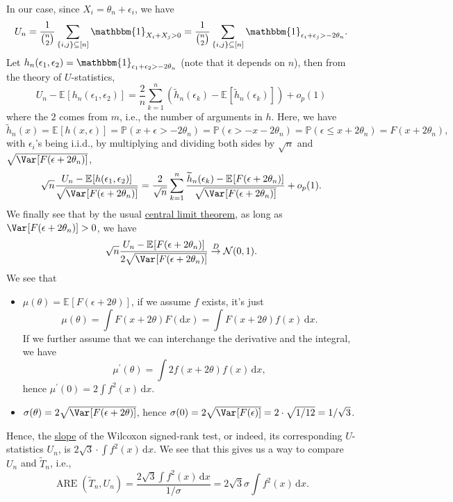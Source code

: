 In our case, since \(X_i = \theta _n + \epsilon _i\), we have
\[
	U_n
	= \frac{1}{\binom{n}{2}} \sum_{\{ i, j \} \subseteq [n]} \mathbbm{1}_{X_i + X_j > 0}
	= \frac{1}{\binom{n}{2}} \sum_{\{ i, j \} \subseteq [n]} \mathbbm{1}_{\epsilon _i + \epsilon _j > - 2 \theta _n}.
\]
Let \(h_n(\epsilon _1, \epsilon _2) = \mathbbm{1}_{\epsilon _1 + \epsilon _2 > - 2 \theta _n} \) (note that it depends on \(n\)), then from the theory of \(U\)-statistics,
\[
	U_n - \mathbb{E}_{}[h_n(\epsilon _1, \epsilon _2)]
	= \frac{2}{n} \sum_{k=1}^{n} \left( \widetilde{h} _n(\epsilon _k) - \mathbb{E}_{}[\widetilde{h} _n(\epsilon _k)] \right) + o_p(1)
\]
where the \(2\) comes from \(m\), i.e., the number of arguments in \(h\). Here, we have
\[
	\widetilde{h} _n(x)
	= \mathbb{E}_{}[h(x, \epsilon )]
	= \mathbb{P} (x + \epsilon > - 2\theta _n)
	= \mathbb{P} (\epsilon > -x - 2\theta _n)
	= \mathbb{P} (\epsilon \leq x + 2 \theta _n)
	= F(x + 2 \theta _n),
\]
with \(\epsilon _i\)'s being i.i.d., by multiplying and dividing both sides by \(\sqrt{n} \) and \(\sqrt{\Var_{}[F(\epsilon + 2 \theta _n)] } \),
\[
	\sqrt{n} \frac{U_n - \mathbb{E}_{}[h(\epsilon _1 , \epsilon _2)]}{\sqrt{\Var_{}[F(\epsilon + 2 \theta _n)] } }
	= \frac{2}{\sqrt{n} } \sum_{k=1}^{n} \frac{\widetilde{h} _n(\epsilon _k) - \mathbb{E}_{}[F(\epsilon + 2 \theta _n)] }{\sqrt{\Var_{}[F(\epsilon + 2 \theta _n)] } } + o_p(1).
\]
We finally see that by the usual \hyperref[thm:CLT]{central limit theorem}, as long as \(\Var_{}[F(\epsilon + 2 \theta _n)] > 0\), we have
\[
	\sqrt{n} \frac{U_n - \mathbb{E}_{}[F(\epsilon + 2 \theta _n)] }{2 \sqrt{\Var_{}[F(\epsilon + 2 \theta _n)] } }
	\overset{D}{\to} \mathcal{N} (0, 1).
\]
We see that
\begin{itemize}
	\item \(\mu (\theta ) = \mathbb{E}_{}[F(\epsilon + 2 \theta )] \), if we assume \(f\) exists, it's just
	      \[
		      \mu (\theta ) = \int F(x + 2 \theta ) F(\mathrm{d} x)
		      = \int F(x + 2 \theta ) f(x) \,\mathrm{d} x.
	      \]
	      If we further assume that we can interchange the derivative and the integral, we have
	      \[
		      \mu ^{\prime} (\theta )
		      = \int 2 f(x + 2\theta ) f(x) \,\mathrm{d} x,
	      \]
	      hence \(\mu ^{\prime} (0) = 2 \int f^2(x) \,\mathrm{d} x\).
	\item \(\sigma (\theta ) = 2 \sqrt{\Var_{}[F(\epsilon + 2 \theta )] } \), hence \(\sigma (0) = 2 \sqrt{\Var_{}[F(\epsilon )]} = 2 \cdot \sqrt{1 / 12} = 1 / \sqrt{3}  \).
\end{itemize}
Hence, the \hyperref[def:slope]{slope} of the Wilcoxon signed-rank test, or indeed, its corresponding \(U\)-statistics \(U_n\), is \(2 \sqrt{3} \cdot \int f^2(x) \,\mathrm{d} x\). We see that this gives us a way to compare \(U_n\) and \(\widetilde{T} _n\), i.e.,
\[
	\operatorname{ARE}(\widetilde{T} _n, U_n)
	= \frac{2 \sqrt{3} \int f^2(x)\,\mathrm{d} x}{1 / \sigma }
	= 2\sqrt{3} \sigma \int f^2(x) \,\mathrm{d} x.
\]